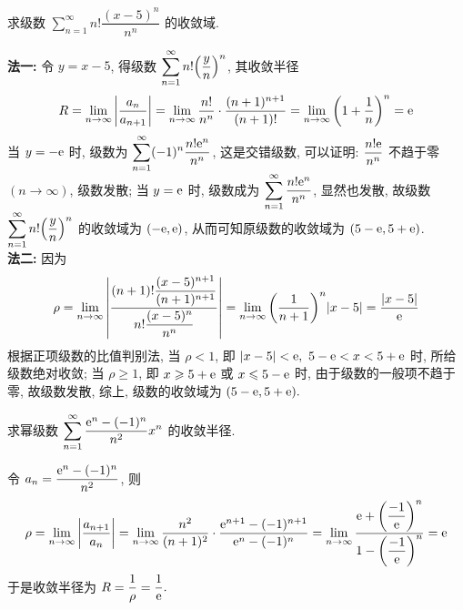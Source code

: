 \begin{example}
    求级数 $\displaystyle\sum_{n=1}^{\infty}n!\dfrac{(x-5)^n}{n^n}$ 的收敛域.
\end{example}
\begin{solution}
    \textbf{法一: }令 $y=x-5$, 得级数 $\displaystyle\sum_{n=1}^{\infty}n!\qty(\dfrac{y}{n})^n$, 其收敛半径
    $$R=\lim_{n\to\infty}\qty|\dfrac{a_n}{a_{n+1}}|=\lim_{n\to\infty}\dfrac{n!}{n^n}\cdot\dfrac{(n+1)^{n+1}}{(n+1)!}=\lim_{n\to\infty}\qty(1+\dfrac{1}{n})^n=\mathrm{e}$$
    当 $y=-\mathrm{e}$ 时, 级数为 $\displaystyle\sum_{n=1}^{\infty}(-1)^n\dfrac{n!\mathrm{e}^n}{n^n}$, 这是交错级数, 可以证明: $\dfrac{n!\mathrm{e}}{n^n}$ 不趋于零 $(n\to\infty)$, 级数发散;
    当 $y=\mathrm{e}$ 时, 级数成为 $\displaystyle\sum_{n=1}^{\infty}\dfrac{n!\mathrm{e}^n}{n^n}$, 显然也发散, 故级数 $\displaystyle\sum_{n=1}^{\infty}n!\qty(\dfrac{y}{n})^n$ 的收敛域为 $(-\mathrm{e},\mathrm{e})$,
    从而可知原级数的收敛域为 $(5-\mathrm{e} ,5+\mathrm{e})$.\\
    \textbf{法二: }因为 $$\rho=\lim_{n\to\infty}\qty|\dfrac{(n+1)!\dfrac{(x-5)^{n+1}}{(n+1)^{n+1}}}{n!\dfrac{(x-5)^n}{n^n}}|=\lim_{n\to\infty}\qty(\dfrac{1}{n+1})^n|x-5|=\dfrac{|x-5|}{\mathrm{e}}$$
    根据正项级数的比值判别法, 当 $\rho<1$, 即 $|x-5|<\mathrm{e},~5-\mathrm{e}<x<5+\mathrm{e}$ 时, 所给级数绝对收敛;
    当 $\rho\geqslant 1$, 即 $x\geqslant 5+\mathrm{e}$ 或 $x\leqslant 5-\mathrm{e}$ 时, 由于级数的一般项不趋于零, 故级数发散, 综上, 级数的收敛域为 $(5-\mathrm{e},5+\mathrm{e}).$
\end{solution}


\begin{example}[2009 数三]
    求幂级数 $\displaystyle\sum_{n=1}^{\infty}\dfrac{\mathrm{e}^n-(-1)^n}{n^2}x^n$ 的收敛半径.
\end{example}
\begin{solution}
    令 $a_n=\dfrac{\mathrm{e}^n-(-1)^n}{n^2}$, 则
    $$\rho=\lim_{n\to\infty}\qty|\dfrac{a_{n+1}}{a_n}|=\lim_{n\to\infty}\dfrac{n^2}{(n+1)^2}\cdot\dfrac{\mathrm{e}^{n+1}-(-1)^{n+1}}{\mathrm{e}^{n}-(-1)^n}=\lim_{n\to\infty}\dfrac{\mathrm{e}+\qty(\dfrac{-1}{\mathrm{e}})^n}{1-\qty(\dfrac{-1}{\mathrm{e}})^n}=\mathrm{e}$$
    于是收敛半径为 $R=\dfrac{1}{\rho}=\dfrac{1}{\mathrm{e}}.$
\end{solution}


